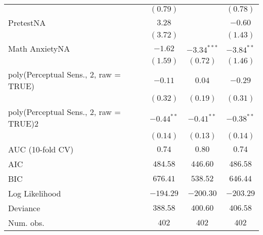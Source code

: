 \begin{center}
\begin{longtable}{l c c c}
                                                   & $(0.79)$     &               & $(0.78)$     \\
PretestNA                           & $3.28$       &               & $-0.60$      \\
                                                   & $(3.72)$     &               & $(1.43)$     \\
Math AnxietyNA                            & $-1.62$      & $-3.34^{***}$ & $-3.84^{**}$ \\
                                                   & $(1.59)$     & $(0.72)$      & $(1.46)$     \\
poly(Perceptual Sens., 2, raw = TRUE)  & $-0.11$      & $0.04$        & $-0.29$      \\
                                                   & $(0.32)$     & $(0.19)$      & $(0.31)$     \\
poly(Perceptual Sens., 2, raw = TRUE)2 & $-0.44^{**}$ & $-0.41^{**}$  & $-0.38^{**}$ \\
                                                   & $(0.14)$     & $(0.13)$      & $(0.14)$     \\
\hline
AUC (10-fold CV)                                   & $0.74$       & $0.80$        & $0.74$       \\
AIC                                                & $484.58$     & $446.60$      & $486.58$     \\
BIC                                                & $676.41$     & $538.52$      & $646.44$     \\
Log Likelihood                                     & $-194.29$    & $-200.30$     & $-203.29$    \\
Deviance                                           & $388.58$     & $400.60$      & $406.58$     \\
Num. obs.                                          & $402$        & $402$         & $402$        \\
\end{longtable}
\end{center}
